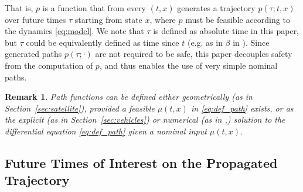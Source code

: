 \documentclass[10pt,conference]{ieeeconf}
\renewcommand{\(}{\left(}
\renewcommand{\)}{\right)}
\renewcommand{\[}{\left[}
\renewcommand{\]}{\right]}
\newtheorem{remark}{Remark}
\begin{document}
That is, $p$ is a function that from {every $(t,x)$} generates a trajectory $p(\tau; t,x)$ over future times $\tau$ starting from state $x$, where $p$ must be feasible according to the dynamics \eqref{eq:model}. We note that $\tau$ is defined as absolute time in this paper, but $\tau$ could be equivalently defined as time since $t$ (e.g. as in $\beta$ in \cite[Sec. 3.3]{Automatica}). Since generated paths $p(\tau; \cdot)$ are not required to be safe, 
{this paper decouples safety from the computation of $p$, and thus enables the use of very simple nominal paths.} %

\begin{remark}
Path functions can be defined either geometrically (as in Section~\ref{sec:satellite}), provided a feasible $\mu(t,x)$ in \eqref{eq:def_path} exists, or as the explicit (as in Section~\ref{sec:vehicles}) or numerical (as in \cite[Eq. 26]{Automatica}{,\cite[Eq. 23]{backup_controller}}) solution to the differential equation \eqref{eq:def_path} given a nominal input $\mu(t,x)$.
\end{remark}



\subsection{Future Times of Interest on the Propagated Trajectory} \label{sec:method_b}
\end{document}
